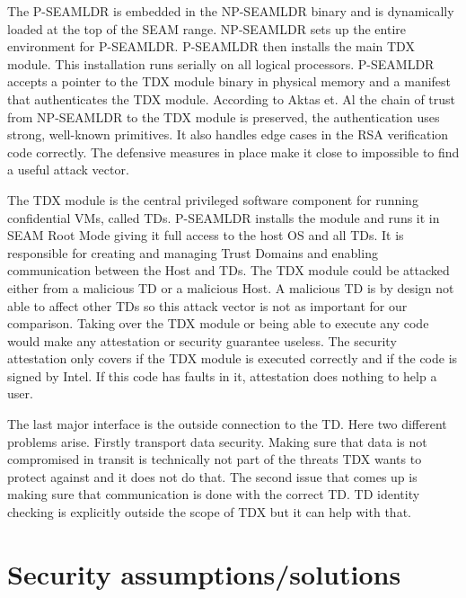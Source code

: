 
The \Gls{P-SEAMLDR} is embedded in the NP-SEAMLDR binary and is dynamically loaded at the top of the SEAM range. \Gls{NP-SEAMLDR} sets up the entire environment for P-SEAMLDR. \Gls{P-SEAMLDR} then installs the main TDX module. This installation runs serially on all logical processors. \Gls{P-SEAMLDR} accepts a pointer to the TDX module binary in physical memory and a manifest that authenticates the TDX module. According to Aktas et. Al the chain of trust from \Gls{NP-SEAMLDR} to the TDX module is preserved, the authentication uses strong, well-known primitives. It also handles edge cases in the RSA verification code correctly. The defensive measures in place make it close to impossible to find a useful attack vector.


The TDX module is the central privileged software component for running confidential VMs, called TDs. \Gls{P-SEAMLDR} installs the module and runs it in SEAM Root Mode giving it full access to the host OS and all TDs. It is responsible for creating and managing Trust Domains and enabling communication between the Host and TDs. The TDX module could be attacked either from a malicious TD or a malicious Host. A malicious TD is by design not able to affect other TDs so this attack vector is not as important for our comparison. Taking over the TDX module or being able to execute any code would make any attestation or security guarantee useless. The security attestation only covers if the TDX module is executed correctly and if the code is signed by Intel. If this code has faults in it, attestation does nothing to help a user.


The last major interface is the outside connection to the TD. Here two different problems arise. Firstly transport data security. Making sure that data is not compromised in transit is technically not part of the threats TDX wants to protect against and it does not do that. The second issue that comes up is making sure that communication is done with the correct TD. TD identity checking is explicitly outside the scope of TDX but it can help with that.


\section{Security assumptions/solutions} 

